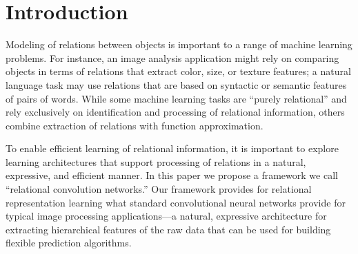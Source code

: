 \section{Introduction}\label{sec:intro}



Modeling of relations between objects is important to a range of machine learning problems. For instance, an image analysis application might rely on comparing objects in terms of relations that extract color, size, or texture features; a natural language task may use relations that are based on syntactic or semantic features of pairs of words. While some machine learning tasks are ``purely relational'' and rely exclusively on identification and processing of relational information, others combine extraction of relations with function approximation.

To enable efficient learning of relational information, it is important to explore learning architectures that support processing of relations in a natural, expressive, and efficient manner. In this paper we propose a framework we call ``relational convolution networks.'' Our framework provides for relational representation learning what standard convolutional neural networks provide for typical image processing applications---a natural, expressive architecture for extracting hierarchical features of the raw data that can be used for building flexible prediction algorithms.

